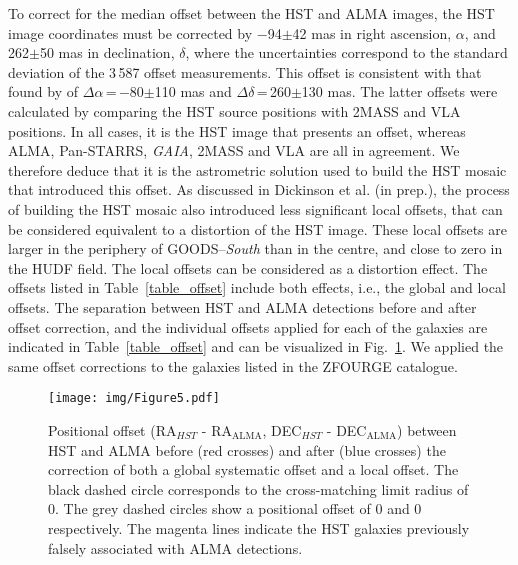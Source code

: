 \documentclass[longauth]{aa}
\begin{document}
To correct for the median offset between the HST and ALMA images, the HST image coordinates must be corrected by $-$94$\pm$42 mas in right ascension, $\alpha$, and 262$\pm$50 mas in declination, $\delta$, where the uncertainties correspond to the standard deviation of the 3\,587 offset measurements. This offset is consistent with that found by \cite{Rujopakarn2016} of $\Delta \alpha$\,=\,$-$80$\pm$110 mas and  $\Delta \delta$\,=\,260$\pm$130 mas. The latter offsets were calculated by comparing the HST source positions with 2MASS and VLA positions. In all cases, it is the HST image that presents an offset, whereas ALMA, Pan-STARRS, \textit{GAIA}, 2MASS and VLA are all in agreement.  We therefore deduce that it is the astrometric solution used to build the HST mosaic that introduced this offset. As discussed in Dickinson et al. (in prep.), the process of building the HST mosaic also introduced less significant local offsets, that can be considered equivalent to a distortion of the HST image. These local offsets are larger in the periphery of GOODS--\textit{South} than in the centre, and close to zero in the HUDF field. The local offsets can be considered as a distortion effect. The offsets listed in Table~\ref{table_offset} include both effects, i.e., the global and local offsets. The separation between HST and ALMA detections before and after offset correction, and the individual offsets applied for each of the galaxies are indicated in Table~\ref{table_offset} and can be visualized in Fig.~\ref{offset_plot}. We applied the same offset corrections to the galaxies listed in the ZFOURGE catalogue.

\begin{figure}
   \centering
   \texttt{[image: img/Figure5.pdf]}
      \caption{Positional offset (RA$_{HST}$ - RA$_\text{ALMA}$, DEC$_{HST}$ - DEC$_\text{ALMA}$) between HST and ALMA before (red crosses) and after (blue crosses) the correction of both a global systematic offset and a local offset. The black dashed circle corresponds to the cross-matching limit radius of 0. The grey dashed circles show a positional offset of 0 and 0 respectively. The magenta lines indicate the HST galaxies previously falsely associated with ALMA detections.}
         \label{offset_plot}
\end{figure}
\end{document}
